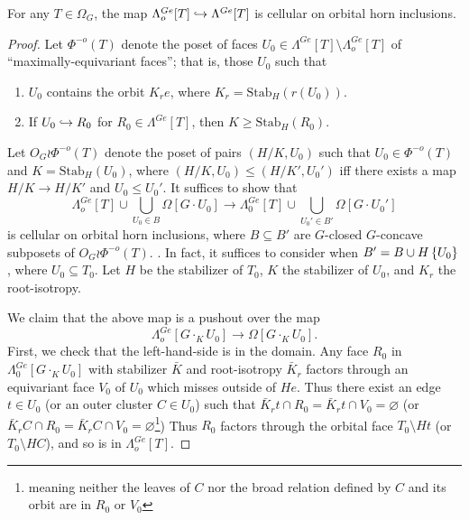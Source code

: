 \documentclass[a4paper,10pt,draft]{article}%
\numberwithin{equation}{section}%
\begin{document}
\begin{proposition}
      \label{GHORN_GOHORN_PROP}
      For any $T \in \Omega_G$, the map
      $\Lambda^{G e}_o[T] \hookrightarrow \Lambda^{G e}[T]$
      is cellular on orbital horn inclusions.
\end{proposition}
\begin{proof}
      Let $\Phi^{-o}(T)$ denote the poset of faces $U_0 \in \Lambda^{G e}[T] \setminus \Lambda^{G e}_o[T]$
      of ``maximally-equivariant faces''; that is, those $U_0$ such that
      \begin{enumerate}
      \item $U_0$ contains the orbit $K_r e$, where $K_r = \mathrm{Stab}_H(r(U_0))$.
      \item If $U_0 \hookrightarrow R_0$ for $R_0 \in \Lambda^{G e}[T]$, then $K \geq \mathrm{Stab}_H(R_0)$. 
      \end{enumerate}
      Let $O_G \wr \Phi^{-o}(T)$ denote the poset of pairs $(H/K, U_0)$ such that
      $U_0 \in \Phi^{-o}(T)$ and
      $K = \mathrm{Stab}_H(U_0)$, where 
      $(H/K, U_0) \leq (H/K', U_0')$ iff there exists a map $H/K \to H/K'$ and $U_0 \leq U_0'$.
      It suffices to show that
      \begin{equation}
            \Lambda^{G e}_o[T] \cup \mathop{\bigcup}\limits_{U_0 \in B} \Omega[G \cdot U_0]
            \to
            \Lambda_0^{G e}[T] \cup \mathop{\bigcup}\limits_{U_0' \in B'} \Omega[G \cdot U_0']
      \end{equation}
      is cellular on orbital horn inclusions, where
      $B \subseteq B'$ are $G$-closed $G$-concave subposets of $O_G \wr \Phi^{-o}(T)$.
      .
      In fact, it suffices to consider when $B' = B \cup H \left\{U_0\right\}$, where $U_0 \subseteq T_0$.
      Let $H$ be the stabilizer of $T_0$, $K$ the stabilizer of $U_0$, and $K_r$ the root-isotropy.

      We claim that the above map is a pushout over the map
      \begin{equation}
            \Lambda^{G e}_o[G \cdot_K U_0] \to \Omega[G \cdot_K U_0].
      \end{equation}
      First, we check that the left-hand-side is in the domain.
      Any face $R_0$ in $\Lambda^{G e}_0[G \cdot_K U_0]$ with stabilizer $\bar K$ and root-isotropy $\bar K_r$
      factors through an equivariant face $V_0$ of $U_0$ which misses outside of $H e$.
      Thus there exist an edge $t\in U_0$ (or an outer cluster $C \in U_0$) such that
      $\bar K_r t \cap R_0 = \bar K_r t \cap V_0 = \varnothing$
      (or $\bar K_r C \cap R_0 = \bar K_r C \cap V_0 = \varnothing$\footnote{
        meaning neither the leaves of $C$
        nor the broad relation defined by $C$ and its orbit
        are in $R_0$ or $V_0$})
      Thus $R_0$ factors through the orbital face $T_0 \setminus H t$ (or $T_0 \setminus H C$),
      and so is in $\Lambda^{G e}_o[T]$.


\end{proof}
\end{document}
